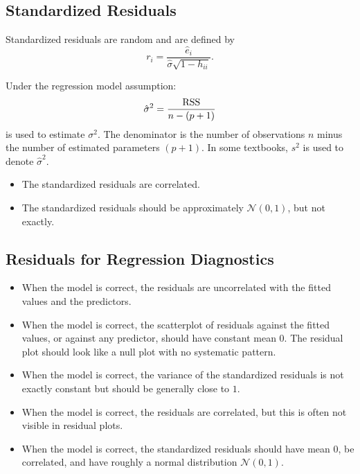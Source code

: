 \subsection{Standardized Residuals}

Standardized residuals are random and are defined by
\[
r_i = \frac{\hat{e}_i}{\hat{\sigma} \sqrt{1 - h_{ii}}}.
\]

Under the regression model assumption:
\[
\hat{\sigma}^2
= \frac{\mathrm{RSS}}{n - (p+1)}
\]
is used to estimate $\sigma^2$. The denominator is the number of observations $n$ minus the number of estimated parameters $(p+1)$. In some textbooks, $s^2$ is used to denote $\hat{\sigma}^2$.

\begin{notebox}
\begin{itemize}
\item The standardized residuals are correlated.
\item The standardized residuals should be approximately $\mathcal{N}(0,1)$, but not exactly.
\end{itemize}
\end{notebox}

\subsection{Residuals for Regression Diagnostics}

\begin{itemize}
  \item When the model is correct, the residuals are uncorrelated with the fitted values and the predictors.

  \item When the model is correct, the scatterplot of residuals against the fitted values, or against any predictor, should have constant mean $0$. The residual plot should look like a null plot with no systematic pattern.

  \item When the model is correct, the variance of the standardized residuals is not exactly constant but should be generally close to $1$.

  \item When the model is correct, the residuals are correlated, but this is often not visible in residual plots.

  \item When the model is correct, the standardized residuals should have mean $0$, be correlated, and have roughly a normal distribution $\mathcal{N}(0,1)$.
\end{itemize}

